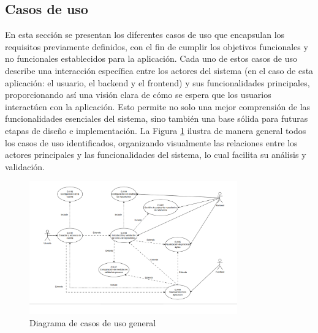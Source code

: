 \subsection{Casos de uso}

En esta sección se presentan los diferentes casos de uso que encapsulan los requisitos previamente definidos, con el fin de cumplir los objetivos funcionales y no funcionales establecidos para la aplicación. Cada uno de estos casos de uso describe una interacción específica entre los actores del sistema (en el caso de esta aplicación: el usuario, el backend y el frontend) y sus funcionalidades principales, proporcionando así una visión clara de cómo se espera que los usuarios interactúen con la aplicación. Esto permite no solo una mejor comprensión de las funcionalidades esenciales del sistema, sino también una base sólida para futuras etapas de diseño e implementación. La Figura \ref{fig:Diagrama-casos-de-uso} ilustra de manera general todos los casos de uso identificados, organizando visualmente las relaciones entre los actores principales y las funcionalidades del sistema, lo cual facilita su análisis y validación.

\begin{figure}[H]
\centering
\includegraphics[width=0.8\textwidth]{img/Diagrama-casos-de-uso.png}
\caption{Diagrama de casos de uso general}
\label{fig:Diagrama-casos-de-uso}
\end{figure}

